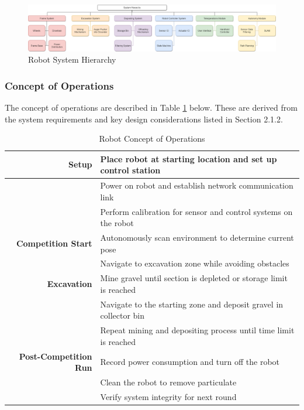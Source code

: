 \documentclass[class=article, crop=false]{standalone}
\begin{document}
	
	\FloatBarrier
		\begin{figure}[h]
			\centering
			\includegraphics[width=1.0\linewidth]{09_Figures/system_hierarchy.png}
			\caption{Robot System Hierarchy}
			\label{fig:system_hierarchy}
		\end{figure}
		\FloatBarrier
		
	\subsubsection{Concept of Operations}
	The concept of operations are described in Table \ref{table:con_ops} below. These are derived from the system requirements and key design considerations listed in Section 2.1.2.
	
	\FloatBarrier
	\begin{table}[h]
	\small
	\centering
	\begin{tabular}{ | r | l |} 
 	\hline
 		\textbf{Setup}                & 
 		                                Place robot at starting location and set up control station \\ 
 		\hline
 		                              & Power on robot and establish network communication link \\
 		\hline
 		                              & Perform calibration for sensor and control systems on the robot \\
 		\hline\hline
 		\textbf{Competition Start}    & 
 		                                Autonomously scan environment to determine current pose \\
 		\hline
 		                              & Navigate to excavation zone while avoiding obstacles  \\
 		\hline\hline
 		\textbf{Excavation}           &
		                                Mine gravel until section is depleted or storage limit is reached \\
		\hline
									 &
									 	Navigate to the starting zone and deposit gravel in collector bin \\
		\hline
									 &
									 	Repeat mining and depositing process until time limit is reached \\
 		\hline\hline
 		\textbf{Post-Competition Run} &
 		                                Record power consumption and turn off the robot \\
 		\hline
 		                              & Clean the robot to remove particulate \\
 		\hline
 		                              & Verify system integrity for next round \\
 		\hline
	\end{tabular}
	\caption{Robot Concept of Operations}
		\label{table:con_ops}
	\end{table}
	\FloatBarrier
	
\end{document}
